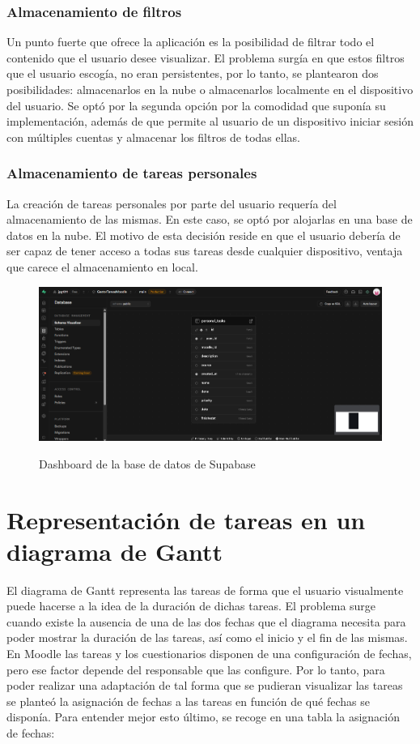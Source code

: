 \subsubsection{Almacenamiento de filtros}
Un punto fuerte que ofrece la aplicación es la posibilidad de filtrar todo el contenido que el usuario desee visualizar. El problema surgía en que estos filtros que el usuario escogía, no eran persistentes, por lo tanto, se plantearon dos posibilidades: almacenarlos en la nube o almacenarlos localmente en el dispositivo del usuario. Se optó por la segunda opción por la comodidad que suponía su implementación, además de que permite al usuario de un dispositivo iniciar sesión con múltiples cuentas y almacenar los filtros de todas ellas.

\subsubsection{Almacenamiento de tareas personales}
La creación de tareas personales por parte del usuario requería del almacenamiento de las mismas. En este caso, se optó por alojarlas en una base de datos en la nube. El motivo de esta decisión reside en que el usuario debería de ser capaz de tener acceso a todas sus tareas desde cualquier dispositivo, ventaja que carece el almacenamiento en local.

\begin{figure}[H]
    \centering
    {\includegraphics[width=0.8\linewidth]{img/supabase_persistencia.png}}
     {\caption{Dashboard de la base de datos de Supabase}
     \label{fig:supabase_persistencia}}
\end{figure}

\section{Representación de tareas en un diagrama de Gantt}
El diagrama de Gantt representa las tareas de forma que el usuario visualmente puede hacerse a la idea de la duración de dichas tareas. El problema surge cuando existe la ausencia de una de las dos fechas que el diagrama necesita para poder mostrar la duración de las tareas, así como el inicio y el fin de las mismas. En Moodle las tareas y los cuestionarios disponen de una configuración de fechas, pero ese factor depende del responsable que las configure. Por lo tanto, para poder realizar una adaptación de tal forma que se pudieran visualizar las tareas se planteó la asignación de fechas a las tareas en función de qué fechas se disponía. Para entender mejor esto último, se recoge en una tabla la asignación de fechas:

